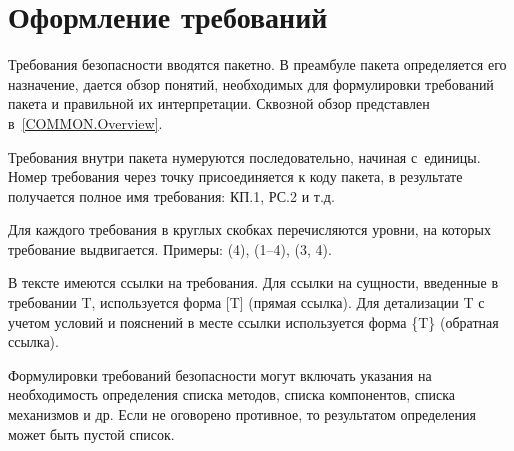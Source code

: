 \section{Оформление требований}\label{COMMON.Notation}

Требования безопасности вводятся пакетно. В преамбуле пакета определяется 
его назначение, дается обзор понятий, необходимых для формулировки 
требований пакета и правильной их интерпретации.
%
Сквозной обзор представлен в~\ref{COMMON.Overview}.

Требования внутри пакета нумеруются последовательно, начиная с~единицы.
%
Номер требования через точку присоединяется к коду пакета, 
в результате получается полное имя требования: КП.1, РС.2 и т.д.

Для каждого требования в круглых скобках перечисляются уровни, 
на которых требование выдвигается.
Примеры: (4), (1--4), (3, 4).

В тексте имеются ссылки на требования. 
%
Для ссылки на сущности, введенные в требовании T, используется 
форма [T] (прямая ссылка).
%
Для детализации T с учетом условий и пояснений в месте ссылки 
используется  форма \{T\} (обратная ссылка).

Формулировки требований безопасности могут включать указания на 
необходимость определения списка методов, списка компонентов, 
списка механизмов и др.
%
Если не оговорено противное, то результатом определения 
может быть пустой список.
